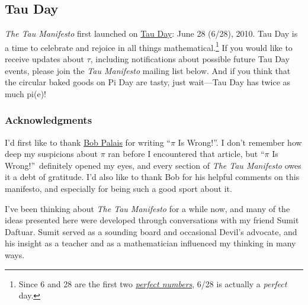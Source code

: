 

  \subsection{Tau Day} %
  \label{sec:tau_day}

\emph{The Tau Manifesto} first launched on \href{https://tauday.com/}{Tau Day}: June 28 (6/28), 2010. Tau Day is a time to celebrate and rejoice in all things mathematical.\footnote{Since 6 and 28 are the first two \href{https://en.wikipedia.org/wiki/Perfect_number}{\emph{perfect numbers}}, 6/28 is actually a \emph{perfect} day.} If you would like to receive updates about $\tau$, including notifications about possible future Tau Day events, please join the \emph{Tau Manifesto} mailing list below. And if you think that the circular baked goods on Pi Day are tasty, just wait---Tau Day has twice as much pi(e)!


  \subsubsection{Acknowledgments} %
  \label{sec:acknowledgments}

I'd first like to thank \href{https://www.math.utah.edu/~palais}{Bob Palais} for writing ``$\pi$ Is Wrong!''. I don't remember how deep my suspicions about $\pi$ ran before I encountered that article, but ``$\pi$ Is Wrong!''\ definitely opened my eyes, and every section of \emph{The Tau Manifesto} owes it a debt of gratitude. I'd also like to thank Bob for his helpful comments on this manifesto, and especially for being such a good sport about it.

I've been thinking about \emph{The Tau Manifesto} for a while now, and many of the ideas presented here were developed through conversations with my friend Sumit Daftuar. Sumit served as a sounding board and occasional Devil's advocate, and his insight as a teacher and as a mathematician influenced my thinking in many ways.

